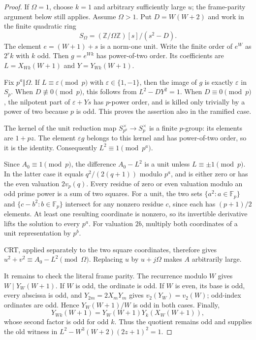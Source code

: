 \documentclass[11pt]{article}
\theoremstyle{remark}\newtheorem{remark}[theorem]{Remark}
\newcommand{\Z}{\mathbb Z}\newcommand{\N}{\mathbb N}
\begin{document}
\begin{proof}
If $\Omega=1$, choose $k=1$ and arbitrary sufficiently large $u$;
the frame-parity argument below still applies. Assume $\Omega>1$.
Put $D=W(W+2)$ and work in the finite quadratic ring
\[
 S_\Omega=(\Z/\Omega\Z)[s]/(s^2-D).
\]
The element $e=(W+1)+s$ is a norm-one unit. Write the finite order of
$e^W$ as $2^r k$ with $k$ odd. Then $g=e^{Wk}$ has power-of-two
order. Its coefficients are $L=X_{Wk}(W+1)$ and $Y=Y_{Wk}(W+1)$.

Fix $p^a\Vert\Omega$. If $L\equiv\varepsilon\pmod p$ with
$\varepsilon\in\{1,-1\}$, then the image of $g$ is exactly
$\varepsilon$ in $S_p$. When $D\not\equiv0\pmod p$, this follows
from $L^2-DY^2=1$. When $D\equiv0\pmod p$, the nilpotent part of
$\varepsilon+Ys$ has $p$-power order, and is killed only trivially by
a power of two because $p$ is odd. This proves the assertion also
in the ramified case.

The kernel of the unit reduction map $S_{p^a}^{\times}\to S_p^{\times}$
is a finite $p$-group: its elements are $1+pz$. The element
$\varepsilon g$ belongs to this kernel and has power-of-two order,
so it is the identity. Consequently $L^2\equiv1\pmod{p^a}$.

Since $A_0\equiv1\pmod p$, the difference $A_0-L^2$ is a unit
unless $L\equiv\pm1\pmod p$. In the latter case it equals
$q^2/(2(q+1))$ modulo $p^a$, and is either zero or has the even
valuation $2v_p(q)$. Every residue of zero or even valuation modulo
an odd prime power is a sum of two squares. For a unit, the two
sets $\{a^2:a\in\mathbb F_p\}$ and
$\{c-b^2:b\in\mathbb F_p\}$ intersect for any nonzero residue $c$,
since each has $(p+1)/2$ elements. At least
one resulting coordinate is nonzero, so its invertible derivative
lifts the solution to every $p^a$. For valuation $2b$, multiply
both coordinates of a unit representation by $p^b$.

CRT, applied separately to the two square coordinates, therefore gives
$u^2+v^2\equiv A_0-L^2\pmod\Omega$. Replacing $u$ by
$u+j\Omega$ makes $A$ arbitrarily large.

It remains to check the literal frame parity. The recurrence modulo $W$
gives $W\mid Y_W(W+1)$. If $W$ is odd, the ordinate is odd.
If $W$ is even, its base is odd, every abscissa is odd, and
$Y_{2m}=2X_mY_m$ gives $v_2(Y_W)=v_2(W)$; odd-index ordinates are
odd. Hence $Y_W(W+1)/W$ is odd in both cases. Finally,
\[
 Y_{Wk}(W+1)=Y_W(W+1)Y_k(X_W(W+1)),
\]
whose second factor is odd for odd $k$. Thus the quotient remains
odd and supplies the old witness in
$L^2-W^3(W+2)(2z+1)^2=1$.
\end{proof}
\end{document}
